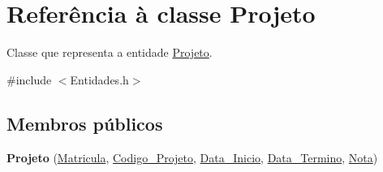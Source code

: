 \hypertarget{class_projeto}{
\section{\-Referência à classe \-Projeto}
\label{class_projeto}
}


\-Classe que representa a entidade \hyperlink{class_projeto}{\-Projeto}.  




{\ttfamily \#include $<$\-Entidades.\-h$>$}

\subsection*{\-Membros públicos}
\begin{DoxyCompactItemize}
\item 
\hypertarget{class_projeto_ab39919e206b2e33b6ab00bfa3bacd9a5}{
{\bfseries \-Projeto} (\hyperlink{class_matricula}{\-Matricula}, \hyperlink{class_codigo___projeto}{\-Codigo\-\_\-\-Projeto}, \hyperlink{class_data___inicio}{\-Data\-\_\-\-Inicio}, \hyperlink{class_data___termino}{\-Data\-\_\-\-Termino}, \hyperlink{class_nota}{\-Nota})}
\label{class_projeto_ab39919e206b2e33b6ab00bfa3bacd9a5}


\end{DoxyCompactItemize}
